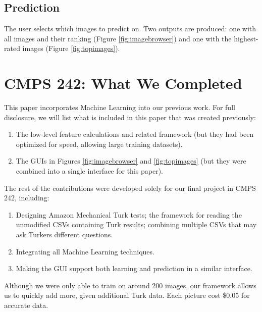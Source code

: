 \documentclass[11pt,letter]{article}
\begin{document}
\subsection{Prediction}
The user selects which images to predict on. Two outputs are produced: one with all images and their ranking (Figure \ref{fig:imagebrowser}) and one with the highest-rated images (Figure \ref{fig:topimages}).

\begin{figure*}[h!]
  \centering
  \caption{This interface shows the unsorted list of images with some of their low-level rankings and final prediction. (The interface displays a rating in $[0,9]$, scaled from the $[0,1]$ range outputted by the application.)}
  \label{fig:imagebrowser}
\end{figure*}

\begin{figure*}[h!]
  \centering
  \caption{This is a quick view of the top twelve images, as rated by the application.}
  \label{fig:topimages}
\end{figure*}

\section{CMPS 242: What We Completed}
This paper incorporates Machine Learning into our previous work. For full disclosure, we will list what is included in this paper that was created previously:

\begin{enumerate}
\item The low-level feature calculations and related framework (but they had been optimized for speed, allowing large training datasets).
\item The GUIs in Figures \ref{fig:imagebrowser} and \ref{fig:topimages} (but they were combined into a single interface for this paper).
\end{enumerate}

The rest of the contributions were developed solely for our final project in CMPS 242, including:
\begin{enumerate}
\item Designing Amazon Mechanical Turk tests; the framework for reading the unmodified CSVs containing Turk results; combining multiple CSVs that may ask Turkers different questions.
\item Integrating all Machine Learning techniques.
\item Making the GUI support both learning and prediction in a similar interface.
\end{enumerate}

Although we were only able to train on around 200 images, our framework allows us to quickly add more, given additional Turk data. Each picture cost \$0.05 for accurate data.



\end{document}

